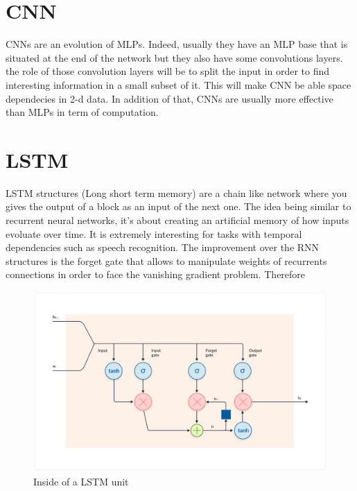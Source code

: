 \section{CNN}
CNNs are an evolution of MLPs. Indeed, usually they have an MLP base that is situated at the end of the network but they also have some convolutions layers. the role of those convolution layers will be to split the input in order to find interesting information in a small subset of it. This will make CNN be able space dependecies in 2-d data. In addition of that, CNNs are usually more effective than MLPs in term of computation. 

\section{LSTM}

LSTM structures (Long short term memory) are a chain like network where you gives the output of a block as an input of the next one. The idea being similar to recurrent neural networks, it's about creating an artificial memory of how inputs evoluate over time. It is extremely interesting for tasks with temporal dependencies such as speech recognition. The improvement over the RNN structures is the forget gate that allows to manipulate weights of recurrents connections in order to face the vanishing gradient problem. Therefore 

\begin{figure}[h!]
    \centering
    \includegraphics[width=1\textwidth]{chapters/pictures/lstm_unit.png}
    \caption{Inside of a LSTM unit}
    \label{fig:mlp}
\end{figure}
